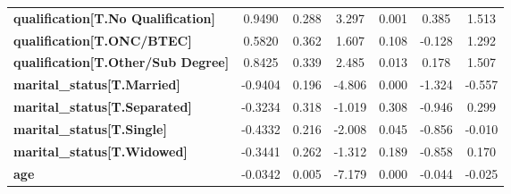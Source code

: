 \begin{center}
\begin{tabular}{lcccccc}
\textbf{qualification[T.No Qualification]}  &       0.9490  &        0.288     &     3.297  &         0.001        &        0.385    &        1.513     \\
\textbf{qualification[T.ONC/BTEC]}          &       0.5820  &        0.362     &     1.607  &         0.108        &       -0.128    &        1.292     \\
\textbf{qualification[T.Other/Sub Degree]}  &       0.8425  &        0.339     &     2.485  &         0.013        &        0.178    &        1.507     \\
\textbf{marital\_status[T.Married]}         &      -0.9404  &        0.196     &    -4.806  &         0.000        &       -1.324    &       -0.557     \\
\textbf{marital\_status[T.Separated]}       &      -0.3234  &        0.318     &    -1.019  &         0.308        &       -0.946    &        0.299     \\
\textbf{marital\_status[T.Single]}          &      -0.4332  &        0.216     &    -2.008  &         0.045        &       -0.856    &       -0.010     \\
\textbf{marital\_status[T.Widowed]}         &      -0.3441  &        0.262     &    -1.312  &         0.189        &       -0.858    &        0.170     \\
\textbf{age}                                &      -0.0342  &        0.005     &    -7.179  &         0.000        &       -0.044    &       -0.025     \\
\bottomrule
\end{tabular}
\end{center}
